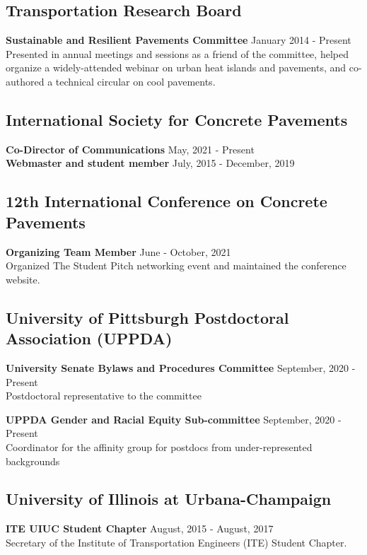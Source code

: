 \documentclass[12pt]{article}
\begin{document}
\subsection*{Transportation Research Board}
\textbf{Sustainable and Resilient Pavements Committee} \hfill January 2014 - Present \\
Presented in annual meetings and sessions as a friend of the committee, helped organize a widely-attended webinar on urban heat islands and pavements, and co-authored a technical circular on cool pavements. \\

\subsection*{International Society for Concrete Pavements}
\textbf{Co-Director of Communications} \hfill May, 2021 - Present \\
\textbf{Webmaster and student member} \hfill July, 2015 - December, 2019 \\

\subsection*{12th International Conference on Concrete Pavements}
\textbf{Organizing Team Member} \hfill June - October, 2021 \\
Organized The Student Pitch networking event and maintained the conference website. \\

\subsection*{University of Pittsburgh Postdoctoral Association (UPPDA)}
\textbf{University Senate Bylaws and Procedures Committee} \hfill September, 2020 - Present \\
Postdoctoral representative to the committee

\textbf{UPPDA Gender and Racial Equity Sub-committee} \hfill September, 2020 - Present \\
Coordinator for the affinity group for postdocs from under-represented backgrounds \\

\subsection*{University of Illinois at Urbana-Champaign} 
\textbf{ITE UIUC Student Chapter} \hfill August, 2015 - August, 2017 \\
Secretary of the Institute of Transportation Engineers (ITE) Student Chapter. 
\end{document}
